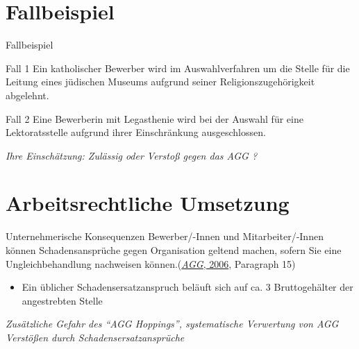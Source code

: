\documentclass[
  10pt,
  ignorenonframetext,
]{beamer}
\providecommand{\tightlist}{%
  \setlength{\itemsep}{0pt}\setlength{\parskip}{0pt}}
\begin{document}
\hypertarget{fallbeispiel}{%
\section{Fallbeispiel}\label{fallbeispiel}}

\begin{frame}{Fallbeispiel}
\begin{block}{Fall 1}
\protect\hypertarget{fall-1}{}
Ein katholischer Bewerber wird im Auswahlverfahren um die Stelle für die
Leitung eines jüdischen Museums aufgrund seiner Religionszugehörigkeit
abgelehnt.
\end{block}

\begin{block}{Fall 2}
\protect\hypertarget{fall-2}{}
Eine Bewerberin mit Legasthenie wird bei der Auswahl für eine
Lektoratsstelle aufgrund ihrer Einschränkung ausgeschlossen.~

\emph{Ihre Einschätzung: Zulässig oder Verstoß gegen das AGG ?}
\end{block}
\end{frame}

\hypertarget{arbeitsrechtliche-umsetzung}{%
\section{Arbeitsrechtliche
Umsetzung}\label{arbeitsrechtliche-umsetzung}}

\begin{frame}{Unternehmerische Konsequenzen}
\protect\hypertarget{unternehmerische-konsequenzen}{}
Bewerber/-Innen und Mitarbeiter/-Innen können Schadensansprüche gegen
Organisation geltend machen, sofern Sie eine Ungleichbehandlung
nachweisen können.(\protect\hyperlink{ref-agg}{\emph{AGG}, 2006},
Paragraph 15)

\begin{itemize}
\tightlist
\item
  Ein üblicher Schadensersatzanspruch beläuft sich auf ca. 3
  Bruttogehälter der angestrebten Stelle
\end{itemize}

\emph{Zusätzliche Gefahr des ``AGG Hoppings'', systematische Verwertung
von AGG Verstößen durch Schadensersatzansprüche}
\end{frame}
\end{document}
